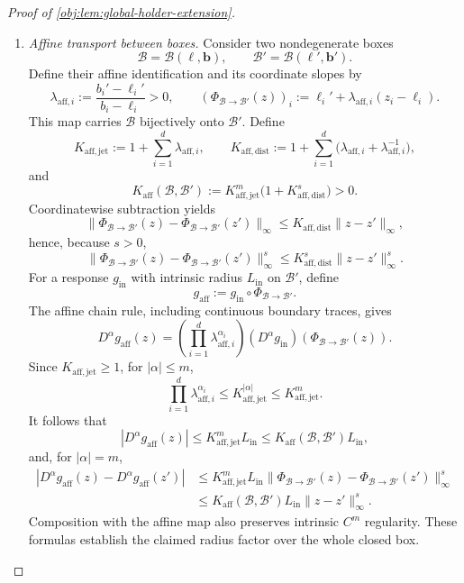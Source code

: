 \documentclass[11pt]{article}
\begin{document}
\begin{proof}[Proof of \cref{obj:lem:global-holder-extension}]
\begin{enumerate}
\item\label{proof:global-holder-extension:affine-transport} \emph{Affine transport between boxes.}
Consider two nondegenerate boxes
\[
\mathcal B=\mathcal B(\boldsymbol\ell,\boldsymbol b),
\qquad
\mathcal B'=\mathcal B(\boldsymbol\ell',\boldsymbol b').
\]
Define their affine identification and its coordinate slopes by
\[
\lambda_{\mathrm{aff},i}
:=\frac{b_i'-\ell_i'}{b_i-\ell_i}>0,
\qquad
(\Phi_{\mathcal B\to\mathcal B'}(z))_i
:=\ell_i'+\lambda_{\mathrm{aff},i}(z_i-\ell_i).
\]
This map carries \(\mathcal B\) bijectively onto \(\mathcal B'\). Define
\[
K_{\mathrm{aff},\mathrm{jet}}
:=1+\sum_{i=1}^d\lambda_{\mathrm{aff},i},
\qquad
K_{\mathrm{aff},\mathrm{dist}}
:=1+\sum_{i=1}^d
\bigl(\lambda_{\mathrm{aff},i}+\lambda_{\mathrm{aff},i}^{-1}\bigr),
\]
and
\[
K_{\mathrm{aff}}(\mathcal B,\mathcal B')
:=
K_{\mathrm{aff},\mathrm{jet}}^m
\bigl(1+K_{\mathrm{aff},\mathrm{dist}}^s\bigr)>0.
\]
Coordinatewise subtraction yields
\[
\|\Phi_{\mathcal B\to\mathcal B'}(z)
-\Phi_{\mathcal B\to\mathcal B'}(z')\|_\infty
\le K_{\mathrm{aff},\mathrm{dist}}\|z-z'\|_\infty,
\]
hence, because \(s>0\),
\[
\|\Phi_{\mathcal B\to\mathcal B'}(z)
-\Phi_{\mathcal B\to\mathcal B'}(z')\|_\infty^s
\le K_{\mathrm{aff},\mathrm{dist}}^s\|z-z'\|_\infty^s.
\]
For a response \(g_{\mathrm{in}}\) with intrinsic radius \(L_{\mathrm{in}}\) on \(\mathcal B'\), define
\[
g_{\mathrm{aff}}:=g_{\mathrm{in}}\circ\Phi_{\mathcal B\to\mathcal B'}.
\]
The affine chain rule, including continuous boundary traces, gives
\[
D^\alpha g_{\mathrm{aff}}(z)
=
\left(\prod_{i=1}^d\lambda_{\mathrm{aff},i}^{\alpha_i}\right)
(D^\alpha g_{\mathrm{in}})
(\Phi_{\mathcal B\to\mathcal B'}(z)).
\]
Since \(K_{\mathrm{aff},\mathrm{jet}}\ge1\), for \(|\alpha|\le m\),
\[
\prod_{i=1}^d\lambda_{\mathrm{aff},i}^{\alpha_i}
\le K_{\mathrm{aff},\mathrm{jet}}^{|\alpha|}
\le K_{\mathrm{aff},\mathrm{jet}}^m.
\]
It follows that
\[
|D^\alpha g_{\mathrm{aff}}(z)|
\le K_{\mathrm{aff},\mathrm{jet}}^mL_{\mathrm{in}}
\le K_{\mathrm{aff}}(\mathcal B,\mathcal B')L_{\mathrm{in}},
\]
and, for \(|\alpha|=m\),
\[
\begin{aligned}
|D^\alpha g_{\mathrm{aff}}(z)-D^\alpha g_{\mathrm{aff}}(z')|
&\le K_{\mathrm{aff},\mathrm{jet}}^mL_{\mathrm{in}}
\|\Phi_{\mathcal B\to\mathcal B'}(z)
-\Phi_{\mathcal B\to\mathcal B'}(z')\|_\infty^s\\
&\le K_{\mathrm{aff}}(\mathcal B,\mathcal B')L_{\mathrm{in}}
\|z-z'\|_\infty^s.
\end{aligned}
\]
Composition with the affine map also preserves intrinsic \(C^m\) regularity. These formulas establish the claimed radius factor over the whole closed box.


\end{enumerate}
\end{proof}
\end{document}
